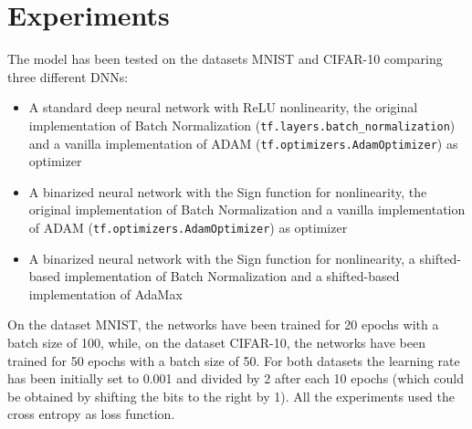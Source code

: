 \documentclass[a4paper]{article}
\numberwithin{equation}{section} %
\numberwithin{figure}{section} %
\numberwithin{table}{section} %
\theoremstyle{definition}
\begin{document}

\section{Experiments}

The model has been tested on the datasets MNIST and CIFAR-10
comparing three different DNNs:
\begin{itemize}
    \item A standard deep neural network with ReLU
        nonlinearity, the original implementation of
        Batch Normalization
        (\texttt{tf.layers.batch\_normalization})
        and a vanilla implementation of ADAM
        (\texttt{tf.optimizers.AdamOptimizer}) as optimizer
    \item A binarized neural network with the Sign function
        for nonlinearity, the original implementation of
        Batch Normalization and a vanilla implementation of ADAM
        (\texttt{tf.optimizers.AdamOptimizer}) as optimizer
    \item A binarized neural network with the Sign function
        for nonlinearity, a shifted-based implementation
        of Batch Normalization and a shifted-based
        implementation of AdaMax
\end{itemize}

On the dataset MNIST, the networks have been trained for 20
epochs with a batch size of 100, while, on the dataset
CIFAR-10, the networks have been trained for 50 epochs
with a batch size of 50. For both datasets the learning
rate has been initially set to 0.001 and divided by 2
after each 10 epochs (which could be obtained by
shifting the bits to the right by 1). All the
experiments used the cross entropy as loss function.
\end{document}
